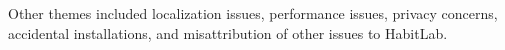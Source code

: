 Other themes included localization issues, performance issues, privacy concerns, accidental installations, and misattribution of other issues to HabitLab.

